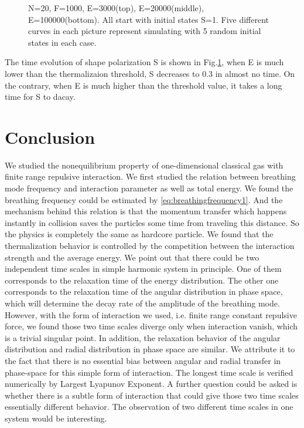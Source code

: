 \documentclass[aps,pre,twocolumn,groupedaddress]{revtex4-1}
\begin{document}
\begin{figure}
\caption{N=20, F=1000, E=3000(top), E=20000(middle), E=100000(bottom). All start with initial states S=1. Five different curves in each picture represent simulating with 5 random initial states in each case. \label{fig:shape}}
\end{figure}

The time evolution of shape polarization S is shown in Fig.\ref{fig:shape}, when E is much lower than the thermalizaion threshold, S decreases to 0.3 in almost no time. On the contrary, when E is much higher than the threshold value, it takes a long time for S to dacay.


\section{Conclusion}
We studied the nonequilibrium property of one-dimensional classical gas with finite range repulsive interaction. We first studied the relation between breathing mode frequency and interaction parameter as well as total energy. We found the breathing frequency could be estimated by \ref{eq:breathingfrequency1}. And the mechanism behind this relation is that the momentum transfer which happens instantly in collision saves the particles some time from traveling this distance. So the physics is completely the same as hardcore particle.
We found that the thermalization behavior is controlled by the competition between the interaction strength and the average energy. We point out that there could be two independent time scales in simple harmonic system in principle. One of them corresponds to the relaxation time of the energy distribution. The other one corresponds to the relaxation time of the angular distribution in phase space, which will determine the decay rate of the amplitude of the breathing mode. However, with the form of interaction we used, i.e. finite range constant repulsive force, we found those two time scales diverge only when interaction vanish, which is a trivial singular point. In addition, the relaxation behavior of the angular distribution and radial distribution in phase space are similar. We attribute it to the fact that there is no essential bias between angular and radial transfer in phase-space for this simple form of interaction. The longest time scale is verified numerically by Largest Lyapunov Exponent. A further question could be asked is whether there is a subtle form of interaction that could give those two time scales essentially different behavior. The observation of two different time scales in one system would be interesting.
\end{document}
